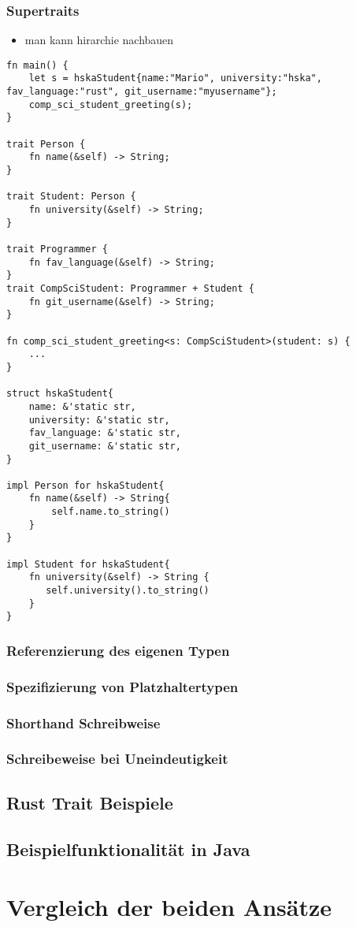 \documentclass[a4paper, 1ppt]{article}
\begin{document}
\subsubsection{Supertraits}
\begin{itemize}
	\item man kann hirarchie nachbauen
\end{itemize}
\begin{verbatim}
fn main() {
    let s = hskaStudent{name:"Mario", university:"hska", fav_language:"rust", git_username:"myusername"};
    comp_sci_student_greeting(s);
}

trait Person {
    fn name(&self) -> String;
}

trait Student: Person {
    fn university(&self) -> String;
}

trait Programmer {
    fn fav_language(&self) -> String;
}
trait CompSciStudent: Programmer + Student {
    fn git_username(&self) -> String;
}

fn comp_sci_student_greeting<s: CompSciStudent>(student: s) {
    ...
}

struct hskaStudent{
    name: &'static str,
    university: &'static str,
    fav_language: &'static str,
    git_username: &'static str,
}

impl Person for hskaStudent{
    fn name(&self) -> String{
        self.name.to_string()
    }
}

impl Student for hskaStudent{
    fn university(&self) -> String {
       self.university().to_string() 
    }
}
\end{verbatim}
\subsubsection{Referenzierung des eigenen Typen}
\subsubsection{Spezifizierung von Platzhaltertypen}
\subsubsection{Shorthand Schreibweise}
\subsubsection{Schreibeweise bei Uneindeutigkeit}
\subsection{Rust Trait Beispiele}
\subsection{Beispielfunktionalität in Java}
\section{Vergleich der beiden Ansätze}



\end{document}
